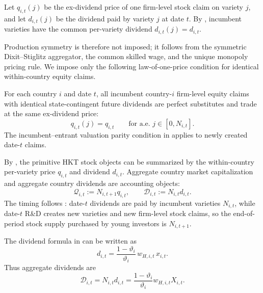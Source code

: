 \documentclass{article}
\begin{document}
Let $q_{i,t}(j)$ be the ex-dividend price of one firm-level stock claim on variety $j$, and let $d_{i,t}(j)$ be the dividend paid by variety $j$ at date $t$. By , incumbent varieties have the common per-variety dividend $d_{i,t}(j)=d_{i,t}$.

Production symmetry is therefore not imposed; it follows from the symmetric Dixit--Stiglitz aggregator, the common skilled wage, and the unique monopoly pricing rule. We impose only the following law-of-one-price condition for identical within-country equity claims.

\begin{ass}\label{ass_within_country_lop}
For each country $i$ and date $t$, all incumbent country-$i$ firm-level equity claims with identical state-contingent future dividends are perfect substitutes and trade at the same ex-dividend price:
\[
q_{i,t}(j)=q_{i,t}
\qquad\text{for a.e. }j\in[0,N_{i,t}].
\]
The incumbent--entrant valuation parity condition in  applies to newly created date-$t$ claims.
\end{ass}

By , the primitive HKT stock objects can be summarized by the within-country per-variety price $q_{i,t}$ and dividend $d_{i,t}$.
Aggregate country market capitalization and aggregate country dividends are accounting objects:
\begin{equation}\label{country_stock_aggregation}
\mathcal Q_{i,t}
:=
N_{i,t+1}q_{i,t},
\qquad
\mathcal D_{i,t}
:=
N_{i,t}d_{i,t}.
\end{equation}
The timing follows \citet{hirano2025technological}: date-$t$ dividends are paid by incumbent varieties $N_{i,t}$, while date-$t$ R\&D creates new varieties and new firm-level stock claims, so the end-of-period stock supply purchased by young investors is $N_{i,t+1}$.

The dividend formula in  can be written as
\begin{equation}\label{country_variety_profit}
d_{i,t}
=
\frac{1-\vartheta_i}{\vartheta_i}\,w_{H,i,t}\,x_{i,t}.
\end{equation}
Thus aggregate dividends are
\begin{equation}\label{country_dividend_formula}
\mathcal D_{i,t}
=
N_{i,t}d_{i,t}
=
\frac{1-\vartheta_i}{\vartheta_i}w_{H,i,t}X_{i,t}.
\end{equation}
\end{document}
